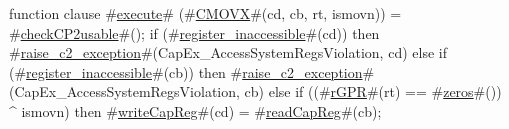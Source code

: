function clause #\hyperref[zexecute]{execute}# (#\hyperref[zCMOVX]{CMOVX}#(cd, cb, rt, ismovn)) =
{
  #\hyperref[zcheckCPtwousable]{checkCP2usable}#();
  if (#\hyperref[zregisterzyinaccessible]{register\_inaccessible}#(cd)) then
    #\hyperref[zraisezyctwozyexception]{raise\_c2\_exception}#(CapEx_AccessSystemRegsViolation, cd)
  else if (#\hyperref[zregisterzyinaccessible]{register\_inaccessible}#(cb)) then
    #\hyperref[zraisezyctwozyexception]{raise\_c2\_exception}#(CapEx_AccessSystemRegsViolation, cb)
  else if ((#\hyperref[zrGPR]{rGPR}#(rt) == #\hyperref[zzzeros]{zeros}#()) ^ ismovn) then
    #\hyperref[zwriteCapReg]{writeCapReg}#(cd) = #\hyperref[zreadCapReg]{readCapReg}#(cb);
}
